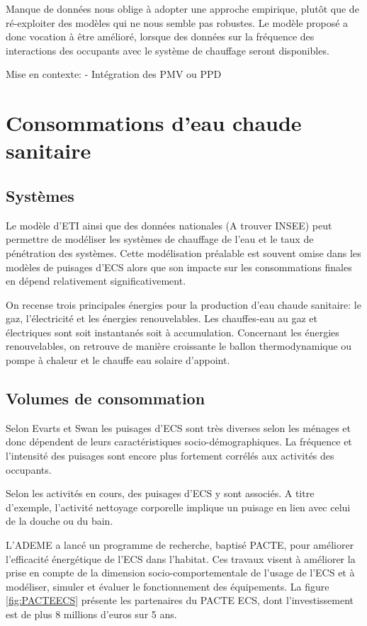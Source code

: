 Manque de données nous oblige à adopter une approche empirique, plutôt que de ré-exploiter des modèles qui ne nous semble pas robustes. Le modèle proposé a donc vocation à être amélioré, lorsque des données sur la fréquence des interactions des occupants avec le système de chauffage seront disponibles.

Mise en contexte:
- Intégration des PMV ou PPD

\section{Consommations d'eau chaude sanitaire}

\subsection{Systèmes}

Le modèle d'ETI ainsi que des données nationales (A trouver INSEE) peut permettre de modéliser les systèmes de chauffage de l'eau et le taux de pénétration des systèmes. Cette modélisation préalable est souvent omise dans les modèles de puisages d'ECS alors que son impacte sur les consommations finales en dépend relativement significativement.

On recense trois principales énergies pour la production d'eau chaude sanitaire: le gaz, l'électricité et les énergies renouvelables. Les chauffes-eau au gaz et électriques sont soit instantanés soit à accumulation. Concernant les énergies renouvelables, on retrouve de manière croissante le ballon thermodynamique ou pompe à chaleur et le chauffe eau solaire d'appoint.

\subsection{Volumes de consommation}

Selon Evarts et Swan \cite{Evarts-13} les puisages d'ECS sont très diverses selon les ménages et donc dépendent de leurs caractéristiques socio-démographiques. La fréquence et l'intensité des puisages sont encore plus fortement corrélés aux activités des occupants.

Selon les activités en cours, des puisages d'ECS y sont associés. A titre d'exemple, l'activité nettoyage corporelle implique un puisage en lien avec celui de la douche ou du bain.

L'ADEME a lancé un programme de recherche, baptisé PACTE, pour améliorer l'efficacité énergétique de l'ECS dans l'habitat. Ces travaux visent à améliorer la prise en compte de la dimension socio-comportementale de l'usage de l'ECS et à modéliser, simuler et évaluer le fonctionnement des équipements. La figure \ref{fig:PACTEECS} présente les partenaires du PACTE ECS, dont l'investissement est de plus 8 millions d'euros sur 5 ans.

